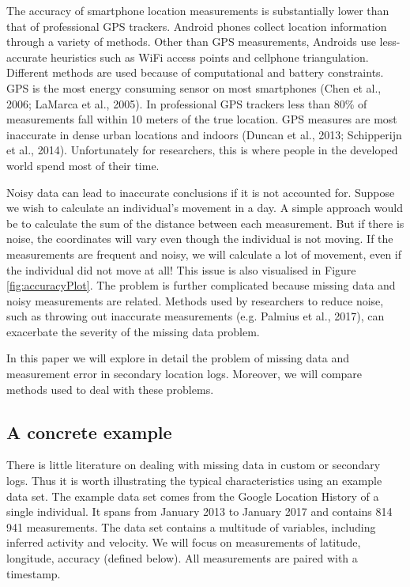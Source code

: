 \documentclass[english,man]{apa6}
\theoremstyle{definition}
\theoremstyle{definition}
\theoremstyle{definition}
\theoremstyle{remark}
\begin{document}
The accuracy of smartphone location measurements is substantially lower
than that of professional GPS trackers. Android phones collect location
information through a variety of methods. Other than GPS measurements,
Androids use less-accurate heuristics such as WiFi access points and
cellphone triangulation. Different methods are used because of
computational and battery constraints. GPS is the most energy consuming
sensor on most smartphones (Chen et al., 2006; LaMarca et al.,
2005). In professional GPS trackers less than 80\% of measurements fall
within 10 meters of the true location. GPS measures are most inaccurate
in dense urban locations and indoors (Duncan et al., 2013;
Schipperijn et al., 2014). Unfortunately for researchers, this is where
people in the developed world spend most of their time.

Noisy data can lead to inaccurate conclusions if it is not accounted
for. Suppose we wish to calculate an individual's movement in a day. A
simple approach would be to calculate the sum of the distance between
each measurement. But if there is noise, the coordinates will vary even
though the individual is not moving. If the measurements are frequent
and noisy, we will calculate a lot of movement, even if the individual
did not move at all! This issue is also visualised in Figure
\ref{fig:accuracyPlot}. The problem is further complicated because
missing data and noisy measurements are related. Methods used by
researchers to reduce noise, such as throwing out inaccurate
measurements (e.g. Palmius et al., 2017), can exacerbate the severity of
the missing data problem.

In this paper we will explore in detail the problem of missing data and
measurement error in secondary location logs. Moreover, we will compare
methods used to deal with these problems.

\subsection{A concrete example}\label{a-concrete-example}

There is little literature on dealing with missing data in custom or
secondary logs. Thus it is worth illustrating the typical
characteristics using an example data set. The example data set comes
from the Google Location History of a single individual. It spans from
January 2013 to January 2017 and contains 814 941 measurements. The data
set contains a multitude of variables, including inferred activity and
velocity. We will focus on measurements of latitude, longitude, accuracy
(defined below). All measurements are paired with a timestamp.
\end{document}
